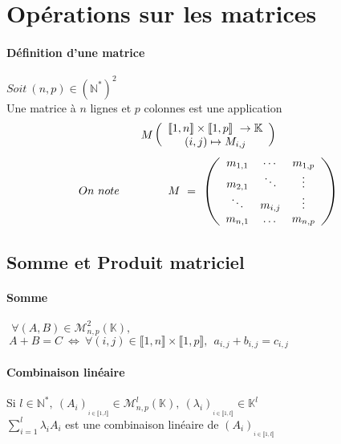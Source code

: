 

\minitoc
	\section{Opérations sur les matrices}
		\paragraph{Définition d'une matrice}
			$Soit~(n,p)\in (\mathbb{N}^{*})^{2}$ \\
			Une matrice à $n$ lignes et $p$ colonnes est une application
			\[M\left( \begin{array}{l}
			\llbracket 1,n\rrbracket \times \llbracket 1,p\rrbracket ~\rightarrow\mathbb{K}\\ 
			\hspace*{15pt}(i,j)\mapsto M_{i,j} 
			\end{array} \right) \]
			\[On~note~ \hspace*{40pt}
			M~=~ \left( \begin{array}{ccc}
			m_{1,1} & \cdots & m_{1,p} \\
			m_{2,1} & \ddots & \vdots \\
			\ddots & m_{i,j} & \vdots \\
			m_{n,1} & \dots & m_{n,p}
			\end{array} \right) \]
	\subsection{Somme et Produit matriciel}
		\traitd
	 	\paragraph{Somme}
	 	 	$~~\forall (A,B) \in \mathcal{M}_{n,p}^{2} (\mathbb{K} ),$ \\ \hspace*{2.5cm} $ ~A + B = C ~\Longleftrightarrow  ~
	 	 	\forall (i,j) \in \llbracket 1,n\rrbracket \times \llbracket 1,p\rrbracket , 
	 	 	~~ a_{i,j} + b_{i,j} = c_{i,j} $ \trait
	 	 \vspace*{0.3cm}\traitd
		\paragraph{Combinaison linéaire}
	 		Si $l\in\mathbb{N}^* , ~
	 	 	(A_i)_{_{i \in \llbracket 1, l \rrbracket }} \in \mathcal{M}_{n,p}^l
	 	 	(\mathbb{K} ),~(\lambda _i)_{_{i \in \llbracket 1, l \rrbracket }} 
	 	 	\in\mathbb{K}^l$ \\
	 	 	\hspace*{2.5cm}
	 	 	$\sum\limits_{i=1}^l \lambda_i A_i$ est une combinaison linéaire de 
	 	 	$(A_i)_{_{i \in \llbracket 1, l \rrbracket }}$ \trait ${}$ \vspace*{-1.4cm} \traitd
